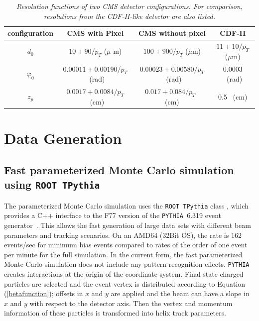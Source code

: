 \documentclass{cmspaper}
\def\root   {\texttt{ROOT }}
\def\pythia {\texttt{PYTHIA }}
\begin{document}
\begin{table} [th]
\begin{center}
 \caption{\it \label{IPresolution} Resolution functions of two CMS detector configurations. For comparison, resolutions from the CDF-II-like detector are also listed.}
\vspace{0.5cm}
\begin{tabular}{|c|c|c|c|} \hline
configuration   &     CMS  with Pixel      &  CMS without pixel  & CDF-II\\ \hline
$d_0$           &  $10 + 90/p_T$ ($\mu$ m)  & $100 + 900/p_T$ ($\mu$m) & $11 + 10/p_T$ ($\mu$m) \\ \hline
$\varphi_0$     &  $0.00011 + 0.00190/p_T$~(rad)    & $0.00023 + 0.00580/p_T$~(rad) & $0.0003$~(rad) \\ \hline
$z_p$           &  $0.0017 + 0.0084/p_T$~(cm)       & $0.017 + 0.084/p_T$~ (cm) & 0.5~ (cm)  \\  \hline 
 \end{tabular}

 \end{center}
\end{table}




\section{\label{sect:generator}Data Generation}
\subsection{\label{sec:fast_parameterized_MC}Fast parameterized Monte Carlo simulation using  \root  \texttt{TPythia}}
The parameterized  Monte Carlo simulation uses the \root  \texttt{TPythia} class \cite{pythia6}, which provides a C++ interface to the F77 version of
 the \pythia 6.319  event generator~\cite{pythia}. This allows the  fast  generation of large data sets 
with different beam parameters and tracking scenarios. 
On an AMD64 (32Bit OS), the rate is 162 events/sec for minimum bias events compared to rates 
of the order of one event per minute for the full simulation. In the current form, the fast parameterized Monte Carlo simulation does not include any  pattern recognition effects.   
\pythia creates interactions at the origin of the coordinate system. Final state charged particles are selected and  the event vertex is distributed  
according to Equation (\ref{betafunction}); offsets in $x$ and $y$ are applied and the beam can  have a slope in $x$ and $y$ with respect to the detector axis. 
Then  the vertex and momentum information of these particles is transformed into helix track parameters.
\end{document}
